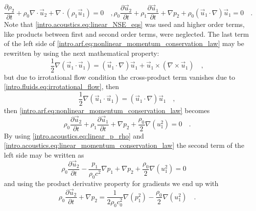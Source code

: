 \begin{subequations}\label{intro.arf.eq:nonlinear_NSE_eqs}
\begin{equation}\label{intro.arf.eq:nonlinear_mass_conservation}
    \frac{\partial\rho_2}{\partial t} + \rho_0\nabla\cdot\vec u_2 + \nabla\cdot(\rho_1\vec u_1) = 0\quad,
\end{equation}    
\begin{equation}\label{intro.arf.eq:nonlinear_momentum_conservation_law}
    \rho_0\frac{\partial\vec u_2}{\partial t} + \rho_1\frac{\partial\vec u_1}{\partial t} + \nabla p_2 + \rho_0(\vec u_1\cdot\nabla)\vec u_1 = 0\quad.
\end{equation}
\end{subequations}
Note that \ref{intro.acoustics.eq:linear_NSE_eqs} was used and higher order terms, like products between first and second order terms, were neglected. The last term of the left side of \ref{intro.arf.eq:nonlinear_momentum_conservation_law} may be rewritten by using the next mathematical property:
\begin{equation}\label{intro.arf.eq:double_dev_property}
    \frac{1}{2}\nabla(\vec u_1\cdot\vec u_1) = (\vec u_1\cdot\nabla)\vec u_1 + \vec u_1 \times (\nabla \times \vec u_1)\quad,
\end{equation}
but due to irrotational flow condition the cross-product term vanishes due to \ref{intro.fluids.eq:irrotational_flow}, then
\begin{equation}\label{intro.arf.eq:double_dev_property_simp}
    \frac{1}{2}\nabla(\vec u_1\cdot\vec u_1) = (\vec u_1\cdot\nabla)\vec u_1\quad,
\end{equation}
then \ref{intro.arf.eq:nonlinear_momentum_conservation_law} becomes
\begin{equation}
    \rho_0\frac{\partial\vec u_2}{\partial t} + \rho_1\frac{\partial\vec u_1}{\partial t} + \nabla p_2 + \frac{\rho_0}{2}\nabla(u_1^2) = 0\quad.
\end{equation}
By using \ref{intro.acoustics.eq:linear_p_rho} and \ref{intro.acoustics.eq:linear_momentum_conservation_law} the second term of the left side may be written as
\begin{equation}
    \rho_0\frac{\partial\vec u_2}{\partial t} - \frac{p_1}{\rho_0 c^2}\nabla p_1 + \nabla p_2 + \frac{\rho_0}{2}\nabla(u_1^2) = 0\quad
\end{equation}
and using the product derivative property for gradients we end up with
\begin{equation}
    \rho_0\frac{\partial\vec u_2}{\partial t} + \nabla p_2 =  \frac{1}{2\rho_0 c_0^2}\nabla(p_1^2) - \frac{\rho_0}{2}\nabla(u_1^2)\quad.
\end{equation}
